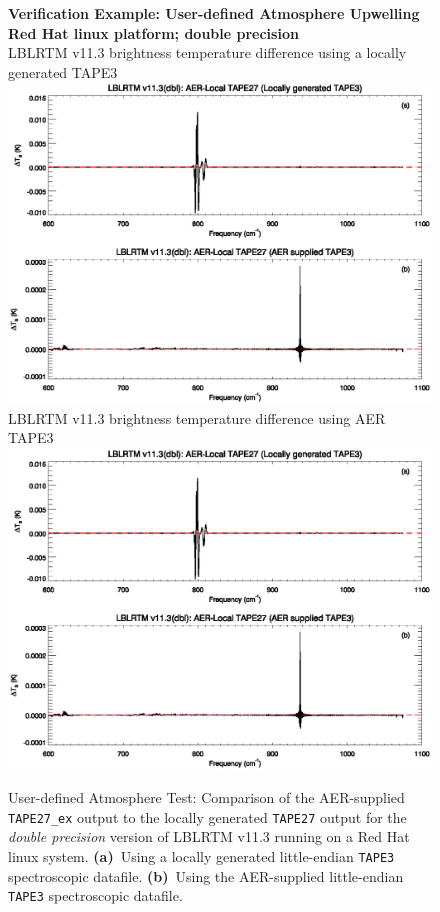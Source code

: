 \begin{figure}[htp]
  \centering
  \qquad\sffamily\textbf{Verification Example: User-defined Atmosphere Upwelling}\\
  \qquad\sffamily\textbf{Red Hat linux platform; double precision}\\
  \qquad\textsf{LBLRTM v11.3 brightness temperature difference using a locally generated TAPE3}\\
  \includegraphics[bb=85 403 534 558,clip,scale=1.0]{graphics/run_example_user_defined_upwelling/dbl.eps}
  \qquad\textsf{LBLRTM v11.3 brightness temperature difference using AER TAPE3}\\
  \includegraphics[bb=85 226 534 381,clip,scale=1.0]{graphics/run_example_user_defined_upwelling/dbl.eps}
  \caption{User-defined Atmosphere Test: Comparison of the AER-supplied \texttt{TAPE27\_ex} output to the locally generated \texttt{TAPE27} output for the \textsl{double precision} version of LBLRTM v11.3 running on a Red Hat linux system. \mbox{\textbf{(a)} Using} a locally generated little-endian \texttt{TAPE3} spectroscopic datafile. \mbox{\textbf{(b)} Using} the AER-supplied little-endian \texttt{TAPE3} spectroscopic datafile.}
  \label{fig:run_example_user_defined_upwelling-dbl}
\end{figure}


